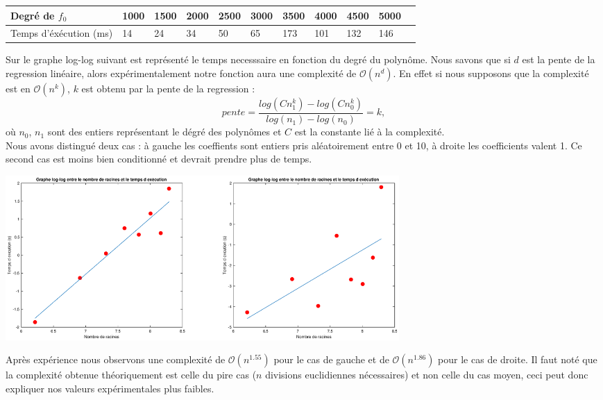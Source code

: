 \documentclass[11pt]{article}
\begin{document}
    \begin{center}
      \begin{tabular}{|l|l|l|l|l|l|l|l|l|l|l|}
  \hline
      Degré de $f_0$ & 1000 & 1500 & 2000 & 2500 & 3000 & 3500 & 4000 & 4500 & 5000 \\
      \hline
     Temps d'éxécution (ms) & 14 & 24 & 34 & 50 & 65 & 173 & 101 & 132 & 146\\
     \hline
  \end{tabular}
    \end{center}

    Sur le graphe log-log suivant est représenté le temps necesssaire en fonction du degré du polynôme.
    Nous savons que si $d$ est la pente de la regression linéaire, alors expérimentalement notre fonction aura
    une complexité de $\mathcal{O}(n^d)$. En effet si nous supposons que la complexité est en $\mathcal{O}(n^k)$, $k$ est obtenu
    par la pente de la regression :
    $$ pente = \frac{log(Cn_1^k)-log(Cn_0^k)}{log(n_1)-log(n_0)} = k, $$
    où $n_0$, $n_1$ sont des entiers représentant le dégré des polynômes et $C$ est la constante lié à la complexité.\\

    Nous avons distingué deux cas : à gauche les coeffients sont entiers pris aléatoirement
    entre 0 et 10, à droite les coefficients valent 1. Ce second cas est moins bien conditionné et devrait prendre plus de temps.

        \begin{center}
          \includegraphics[width=15cm]{image/perfEucl}
        \end{center}

        Après expérience nous observons une complexité de $\mathcal{O}(n^{1.55})$ pour le cas de gauche et de $\mathcal{O}(n^{1.86})$ pour le cas de droite.
        Il faut noté que la complexité obtenue théoriquement est celle du pire cas ($n$ divisions euclidiennes nécessaires) et non celle du cas moyen, ceci peut donc
        expliquer nos valeurs expérimentales plus faibles.
\end{document}
